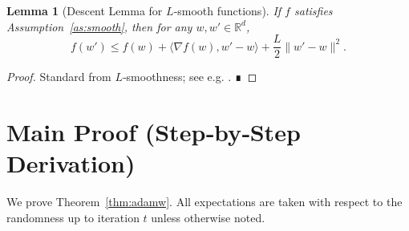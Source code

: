 \documentclass{article}
\newtheorem{lemma}{Lemma}
\newcommand{\RR}{\mathbb{R}}
\begin{document}
\begin{lemma}[Descent Lemma for $L$‑smooth functions]\label{lem:descent}
If $f$ satisfies Assumption~\ref{as:smooth}, then for any $w,w'\in\RR^{d}$,
\[
f(w')\le f(w) + \langle\nabla f(w),w'-w\rangle
          +\frac{L}{2}\|w'-w\|^2 .
\]
\end{lemma}
\begin{proof}
Standard from $L$‑smoothness; see e.g. \cite{Nesterov2004}. ∎
\end{proof}

\section*{Main Proof (Step‑by‑Step Derivation)}
We prove Theorem~\ref{thm:adamw}.  All expectations are taken with respect to the randomness up to iteration $t$ unless otherwise noted.
\end{document}

